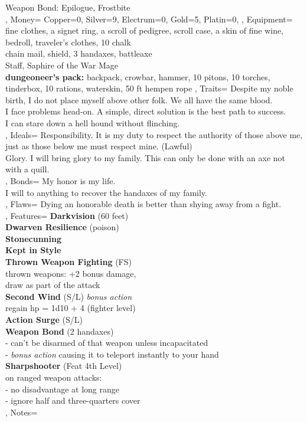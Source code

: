 \documentclass[10pt,a4paper]{scrbook}
\begin{document}
{{{				Weapon Bond: Epilogue, Frostbite\\
			}
		},
		Money={
			Copper=0,
			Silver=9,
			Electrum=0,
			Gold=5,
			Platin=0,
		},
		Equipment={
			fine clothes, a signet ring, a scroll of pedigree, scroll case, a skin of fine wine, bedroll, traveler's clothes, 10 chalk\\
			chain mail, shield, 3 handaxes, battleaxe\\
			Staff, Saphire of the War Mage\\
			\textbf{dungeoneer's pack:} backpack, crowbar, hammer, 10 pitons, 10 torches, tinderbox, 10 rations, waterskin, 50 ft hempen rope
		},
		Traits={
			\tiny
			Despite my noble birth, I do not place myself above other folk. We all have the same blood.\\
			I face problems head-on. A simple, direct solution is the best path to success.\\
			I can stare down a hell hound without flinching.\\
		},
		Ideals={
			\tiny
			Responsibility. It is my duty to respect the authority of those above me, just as those below me must respect mine. (Lawful)\\
			Glory. I will bring glory to my family. This can only be done with an axe not with a quill.\\
		},
		Bonds={
			My honor is my life.\\
			I will to anything to recover the handaxes of my family.\\
		},
		Flaws={
			Dying an honorable death is better than shying away from a fight.\\
		},
		Features={
			\textbf{Darkvision} (60 feet)\\
			\textbf{Dwarven Resilience} (poison)\\
			\textbf{Stonecunning}\\
			\textbf{Kept in Style}\\
			\textbf{Thrown Weapon Fighting} (FS)\\
			thrown weapons: +2 bonus damage,\\
			draw as part of the attack\\
			\textbf{Second Wind} (S/L) \textit{bonus action}\\
			regain hp = 1d10 + 4 (fighter level)\\
			\textbf{Action Surge} (S/L)\\
			\textbf{Weapon Bond} (2 handaxes)\\
			- can't be disarmed of that weapon unless incapacitated\\
			- \textit{bonus action} causing it to teleport instantly to your hand\\
			\textbf{Sharpshooter} (Feat 4th Level)\\
			on ranged weapon attacks:\\
			- no disadvantage at long range\\
			- ignore half and three-quarters cover\\
		},
		Notes={
		}
	}
\end{document}
